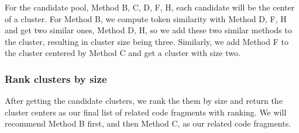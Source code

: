 For the candidate pool, {\ttt Method B, C, D, F, H}, each candidate will be the center of a cluster. For {\ttt Method B}, we compute token similarity with {\ttt Method D, F, H} and get two similar ones, {\ttt Method D, H}, so we add these two similar methods to the cluster, resulting in cluster size being three. Similarly, we add {\ttt Method F} to the cluster centered by {\ttt Method C} and get a cluster with size two.

\subsubsection{Rank clusters by size}
After getting the candidate clusters, we rank the them by size and return the cluster centers as our final list of related code fragments with ranking. We will recommend {\ttt Method B} first, and then {\ttt Method C}, as our related code fragments.